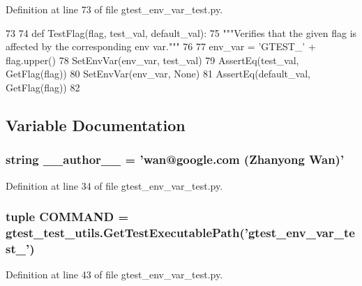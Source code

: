 \-Definition at line 73 of file gtest\-\_\-env\-\_\-var\-\_\-test.\-py.


\begin{DoxyCode}
73 
74 def TestFlag(flag, test_val, default_val):
75   """Verifies that the given flag is affected by the corresponding env var."""
76 
77   env_var = 'GTEST_' + flag.upper()
78   SetEnvVar(env_var, test_val)
79   AssertEq(test_val, GetFlag(flag))
80   SetEnvVar(env_var, None)
81   AssertEq(default_val, GetFlag(flag))
82 

\end{DoxyCode}


\subsection{\-Variable \-Documentation}
\hypertarget{namespacegtest__env__var__test_a629d61dfe4da763164a4d1a2d85b0afd}{
\subsubsection[{\-\_\-\-\_\-author\-\_\-\-\_\-}]{\setlength{\rightskip}{0pt plus 5cm}string {\bf \-\_\-\-\_\-author\-\_\-\-\_\-} = 'wan@google.\-com (\-Zhanyong \-Wan)'}}\label{dd/d84/namespacegtest__env__var__test_a629d61dfe4da763164a4d1a2d85b0afd}


\-Definition at line 34 of file gtest\-\_\-env\-\_\-var\-\_\-test.\-py.

\hypertarget{namespacegtest__env__var__test_add010199942a26d17bd560c1ce462eeb}{
\subsubsection[{\-C\-O\-M\-M\-A\-N\-D}]{\setlength{\rightskip}{0pt plus 5cm}tuple {\bf \-C\-O\-M\-M\-A\-N\-D} = {\bf gtest\-\_\-test\-\_\-utils.\-Get\-Test\-Executable\-Path}('gtest\-\_\-env\-\_\-var\-\_\-test\-\_\-')}}\label{dd/d84/namespacegtest__env__var__test_add010199942a26d17bd560c1ce462eeb}


\-Definition at line 43 of file gtest\-\_\-env\-\_\-var\-\_\-test.\-py.

